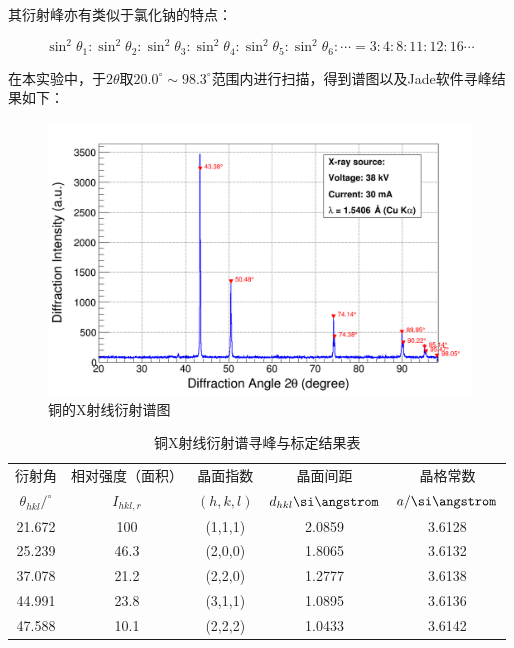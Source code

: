 \documentclass{thuemp}
\begin{document}
其衍射峰亦有类似于氯化钠的特点：

\begin{equation}
    \sin^2\theta_1 : \sin^2\theta_2: \sin^2\theta_3 : \sin^2\theta_4 : \sin^2\theta_5 : \sin^2\theta_6 : \cdots =
    3 : 4 : 8 : 11 : 12: 16 \cdots
    \label{eq:cu_diff_patt}
\end{equation}

在本实验中，于$2\theta$取$20.0^\circ \sim 98.3^\circ$范围内进行扫描，得到谱图以及Jade软件寻峰结果如下：

\begin{figure}[H]
    \centering
    \includegraphics[width=0.8\linewidth]{../Data/Cu-multi.png}
    \caption{铜的X射线衍射谱图}
    \label{fig:cu_xrd}
\end{figure}

\begin{table}
    \centering
    \captionnamefont{\wuhao\bf\heiti}
    \captiontitlefont{\wuhao\bf\heiti}
    \caption{铜X射线衍射谱寻峰与标定结果表}
    \label{tab:cu_xrd}
    \liuhao
    \begin{tabular}{ccccc}
        \toprule
        衍射角 & 相对强度（面积）& 晶面指数 & 晶面间距 & 晶格常数 \\
        $\theta_{hkl}/^\circ$ & $I_{hkl,r}$ & $(h,k,l)$ & $d_{hkl}\text{\si\angstrom}$ & $a/\text{\si\angstrom}$\\
        \midrule
        21.672 &  100 & (1,1,1) & 2.0859 & 3.6128 \\
        25.239 & 46.3 & (2,0,0) & 1.8065 & 3.6132 \\
        37.078 & 21.2 & (2,2,0) & 1.2777 & 3.6138 \\
        44.991 & 23.8 & (3,1,1) & 1.0895 & 3.6136 \\
        47.588 & 10.1 & (2,2,2) & 1.0433 & 3.6142 \\
        \bottomrule
    \end{tabular}
\end{table}
\end{document}
